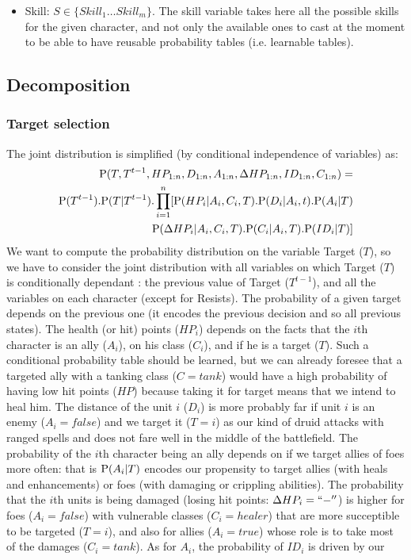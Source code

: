 \begin{itemize}
    \item Skill: $S \in \{Skill_1 \dots Skill_m\}$. The skill variable takes here all the possible skills for the given character, and not only the available ones to cast at the moment to be able to have reusable probability tables (i.e. learnable tables).
\end{itemize}

\subsection{Decomposition}

\subsubsection{Target selection}
The joint distribution is simplified (by conditional independence of variables) as:
\begin{eqnarray}
\mathrm{P}(T, T^{t-1}, HP_{1:n}, D_{1:n}, A_{1:n}, \Delta HP_{1:n}, ID_{1:n}, C_{1:n}) = \\
\mathrm{P}(T^{t-1}).\mathrm{P}(T|T^{t-1}).\prod_{i=1}^n [ \mathrm{P}(HP_i | A_i, C_i, T).\mathrm{P}(D_i | A_i, t).\mathrm{P}(A_i | T)\\
\mathrm{P}(\Delta HP_i | A_i, C_i, T).\mathrm{P}(C_i | A_i, T).\mathrm{P}(ID_i | T) ]
\end{eqnarray}
We want to compute the probability distribution on the variable Target ($T$), so we have to consider the joint distribution with all variables on which Target ($T$) is conditionally dependant : the previous value of Target ($T^{t-1}$), and all the variables on each character (except for Resists). The probability of a given target depends on the previous one (it encodes the previous decision and so all previous states). The health (or hit) points ($HP_i$) depends on the facts that the $i$th character is an ally ($A_i$), on his class ($C_i$), and if he is a target ($T$). Such a conditional probability table should be learned, but we can already foresee that a targeted ally with a tanking class ($C=tank$) would have a high probability of having low hit points ($HP$) because taking it for target means that we intend to heal him. The distance of the unit $i$ ($D_i$) is more probably far if unit $i$ is an enemy ($A_i=false$) and we target it ($T=i$) as our kind of druid attacks with ranged spells and does not fare well in the middle of the battlefield. The probability of the $i$th character being an ally depends on if we target allies of foes more often: that is $\mathrm{P}(A_i|T)$ encodes our propensity to target allies (with heals and enhancements) or foes (with damaging or crippling abilities). The probability that the $i$th units is being damaged (losing hit points: $\Delta HP_i=``-''$) is higher for foes ($A_i=false$) with vulnerable classes ($C_i=healer$) that are more succeptible to be targeted ($T=i$), and also for allies ($A_i=true$) whose role is to take most of the damages ($C_i=tank$). As for $A_i$, the probability of $ID_i$ is driven by our %
